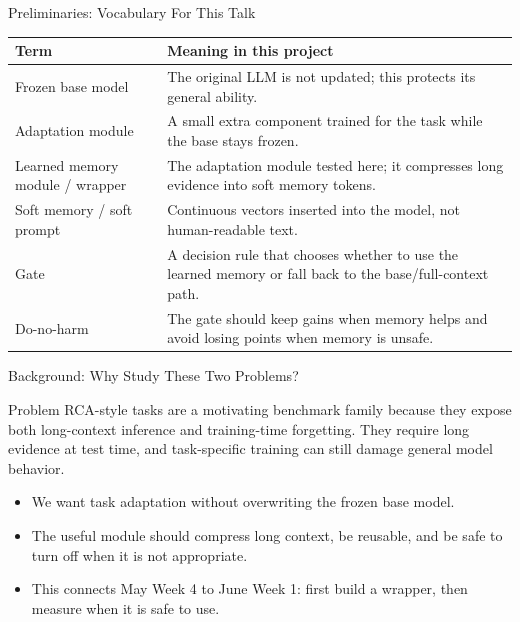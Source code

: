 \begin{frame}{Preliminaries: Vocabulary For This Talk}
  \scriptsize
  \begin{tabular}{p{}p{}}
    \toprule
    Term & Meaning in this project \\
    \midrule
    Frozen base model & The original LLM is not updated; this protects its general ability. \\
    Adaptation module & A small extra component trained for the task while the base stays frozen. \\
    Learned memory module / wrapper & The adaptation module tested here; it compresses long evidence into soft memory tokens. \\
    Soft memory / soft prompt & Continuous vectors inserted into the model, not human-readable text. \\
    Gate & A decision rule that chooses whether to use the learned memory or fall back to the base/full-context path. \\
    Do-no-harm & The gate should keep gains when memory helps and avoid losing points when memory is unsafe. \\
    \bottomrule
  \end{tabular}
\end{frame}

\begin{frame}{Background: Why Study These Two Problems?}
  \begin{block}{Problem}
    RCA-style tasks are a motivating benchmark family because they expose both
    long-context inference and training-time forgetting. They require long
    evidence at test time, and task-specific training can still damage general
    model behavior.
  \end{block}
  \begin{itemize}
    \item We want task adaptation without overwriting the frozen base model.
    \item The useful module should compress long context, be reusable, and be
      safe to turn off when it is not appropriate.
    \item This connects May Week 4 to June Week 1: first build a wrapper, then
      measure when it is safe to use.
  \end{itemize}
\end{frame}

